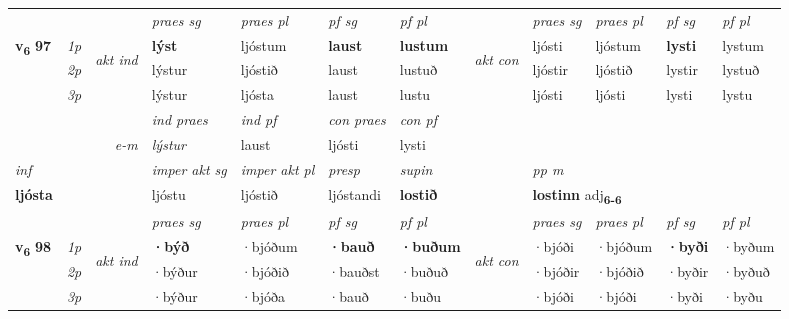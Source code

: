 \begin{longtable}[l]{X>{\footnotesize\itshape}llXXXXlXXXX}
 & &   & \textit{praes sg}  & \textit{praes pl}    & \textit{ pf sg} & \textit{pf pl} & & \textit{praes sg}  & \textit{praes pl}    & \textit{pf sg} & \textit{pf pl }  \\ \cmidrule{4-7} \cmidrule{9-12}
 \multirow{2}{*}{{{\textbf{v{\textsubscript{6}}} \Large{\textbf{97}}}}}  & 1p & \multirow{3}{*}{\begin{turn}{90}\textit{akt ind}\end{turn}} & \textbf{lýst} & ljóstum & \textbf{laust} & \textbf{lustum} & \multirow{3}{*}{\begin{turn}{90}\textit{akt con}\end{turn}} &ljósti & ljóstum & \textbf{lysti} & lystum\\*
 & 2p &  &  lýstur  & ljóstið & laust & lustuð & & ljóstir & ljóstið & lystir & lystuð \\*
 & 3p &  & lýstur & ljósta & laust & lustu & & ljósti & ljósti& lysti & lystu \\*
\cmidrule{4-7} \cmidrule{9-12}

   && &  \textit{ind praes} & \textit{ind pf} & \textit{con praes} & \textit{con pf} \\*
\multicolumn{3}{r}{\textit{e-m}} & lýstur & laust & ljósti & lysti \\*

\cmidrule{4-7}
   {\textit{inf}} & &  & \textit{imper akt sg} & \textit{imper akt pl}   & \textit{presp} & \textit{supin}  && \textit{pp m} \\*
  {\textbf{ljósta}} & && ljóstu  & ljóstið   & ljóstandi &  \textbf{lostið}  && \multicolumn{2}{l}{\textbf{lostinn} adj\textbf{\textsubscript{6-6}}} \\*

\midrule

 & &   & \textit{praes sg}  & \textit{praes pl}    & \textit{ pf sg} & \textit{pf pl} & & \textit{praes sg}  & \textit{praes pl}    & \textit{pf sg} & \textit{pf pl }  \\ \cmidrule{4-7} \cmidrule{9-12}
 \multirow{2}{*}{{{\textbf{v{\textsubscript{6}}} \Large{\textbf{98}}}}}  & 1p & \multirow{3}{*}{\begin{turn}{90}\textit{akt ind}\end{turn}} & \textbf{·býð} & ·bjóðum & \textbf{·bauð} & \textbf{·buðum} & \multirow{3}{*}{\begin{turn}{90}\textit{akt con}\end{turn}} &·bjóði & ·bjóðum & \textbf{·byði} & ·byðum\\*
 & 2p &  &  ·býður  & ·bjóðið & ·bauðst & ·buðuð & & ·bjóðir & ·bjóðið & ·byðir & ·byðuð \\*
 & 3p &  & ·býður & ·bjóða & ·bauð & ·buðu & & ·bjóði & ·bjóði& ·byði & ·byðu \\*
\cmidrule{4-7} \cmidrule{9-12}


\end{longtable}
